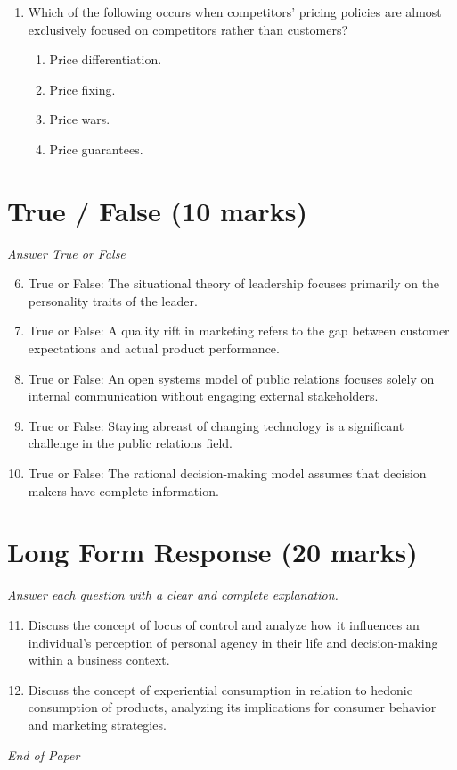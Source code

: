 \documentclass[12pt]{article}
\begin{document}
\begin{enumerate}[label=\arabic*.]
\begin{enumerate}[label=(\alph*)]
    \item Retailers.
\end{enumerate}
\item Which of the following occurs when competitors' pricing policies are almost exclusively focused on competitors rather than customers?
\begin{enumerate}[label=(\alph*)]
    \item Price differentiation.
    \item Price fixing.
    \item Price wars.
    \item Price guarantees.
\end{enumerate}
\end{enumerate}

\section*{True / False (10 marks)}
\textit{Answer True or False}
\begin{enumerate}[label=\arabic*.]
\setcounter{enumi}{5}
\item True or False: The situational theory of leadership focuses primarily on the personality traits of the leader.
\item True or False: A quality rift in marketing refers to the gap between customer expectations and actual product performance.
\item True or False: An open systems model of public relations focuses solely on internal communication without engaging external stakeholders.
\item True or False: Staying abreast of changing technology is a significant challenge in the public relations field.
\item True or False: The rational decision-making model assumes that decision makers have complete information.
\end{enumerate}

\section*{Long Form Response (20 marks)}
\textit{Answer each question with a clear and complete explanation.}
\begin{enumerate}[label=\arabic*.]
\setcounter{enumi}{10}
\item Discuss the concept of locus of control and analyze how it influences an individual's perception of personal agency in their life and decision-making within a business context.
\item Discuss the concept of experiential consumption in relation to hedonic consumption of products, analyzing its implications for consumer behavior and marketing strategies.
\end{enumerate}

\vfill
\noindent\textit{End of Paper}
\end{document}
